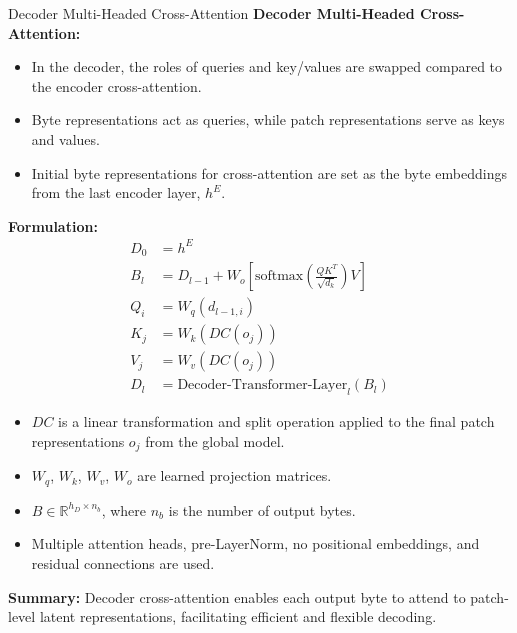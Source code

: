 \begin{frame}[allowframebreaks]{Decoder Multi-Headed Cross-Attention}
    \textbf{Decoder Multi-Headed Cross-Attention:}
    \begin{itemize}
        \item In the decoder, the roles of queries and key/values are swapped compared to the encoder cross-attention.
        \item Byte representations act as queries, while patch representations serve as keys and values.
        \item Initial byte representations for cross-attention are set as the byte embeddings from the last encoder layer, $h^E$.
    \end{itemize}
    \vspace{1em}
    \textbf{Formulation:}
    \begin{align}
        D_0 &= h^E \\
        B_l &= D_{l-1} + W_o \left[ \mathrm{softmax} \left( \frac{Q K^T}{\sqrt{d_k}} \right) V \right] \\
        Q_i &= W_q(d_{l-1,i}) \\
        K_j &= W_k(DC(o_j)) \\
        V_j &= W_v(DC(o_j)) \\
        D_l &= \text{Decoder-Transformer-Layer}_l(B_l)
    \end{align}
    \begin{itemize}
        \item $DC$ is a linear transformation and split operation applied to the final patch representations $o_j$ from the global model.
        \item $W_q$, $W_k$, $W_v$, $W_o$ are learned projection matrices.
        \item $B \in \mathbb{R}^{h_D \times n_b}$, where $n_b$ is the number of output bytes.
        \item Multiple attention heads, pre-LayerNorm, no positional embeddings, and residual connections are used.
    \end{itemize}
    \vspace{1em}
    \textbf{Summary:} Decoder cross-attention enables each output byte to attend to patch-level latent representations, facilitating efficient and flexible decoding.
\end{frame}

